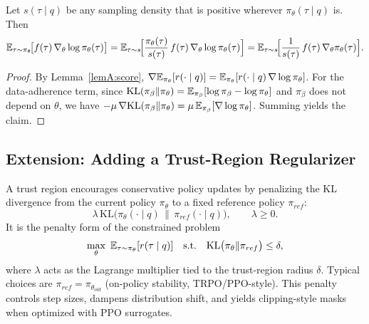 \begin{lemmaA}
\label{lemA:measure}
Let $s(\tau\mid q)$ be any sampling density that is positive wherever $\pi_\theta(\tau\mid q)$ is. Then
\[
\mathbb{E}_{\tau\sim \pi_\theta}\!\big[f(\tau)\,\nabla_\theta \log \pi_\theta(\tau)\big]
=
\mathbb{E}_{\tau\sim s}\!\Big[\frac{\pi_\theta(\tau)}{s(\tau)}\,f(\tau)\,\nabla_\theta \log \pi_\theta(\tau)\Big]
=
\mathbb{E}_{\tau\sim s}\!\Big[\frac{1}{s(\tau)}\,f(\tau)\,\nabla_\theta \pi_\theta(\tau)\Big].
\]
\end{lemmaA}

\begin{proof}
By Lemma~\ref{lemA:score},
$\nabla \mathbb{E}_{\pi_\theta}[r(\cdot\mid q)]=\mathbb{E}_{\pi_\theta}[r(\cdot\mid q)\,\nabla \log \pi_\theta]$.
For the data-adherence term, since
$\mathrm{KL}(\pi_\beta\|\pi_\theta)=\mathbb{E}_{\pi_\beta}[\log \pi_\beta-\log \pi_\theta]$ and $\pi_\beta$ does not depend on $\theta$,
we have $-\mu\,\nabla \mathrm{KL}(\pi_\beta\|\pi_\theta)=\mu\,\mathbb{E}_{\pi_\beta}[\nabla \log \pi_\theta]$.
Summing yields the claim.
\end{proof}

\subsection{Extension: Adding a Trust-Region Regularizer}
\label{app:lambda-extension}
A trust region encourages conservative policy updates by penalizing the KL divergence from the current policy $\pi_\theta$ to a fixed reference policy $\pi_{ref}$:
\[
\lambda\,\mathrm{KL}\big(\pi_\theta(\cdot\mid q)\,\|\,\pi_{ref}(\cdot\mid q)\big),\qquad \lambda\ge 0.
\]
It is the penalty form of the constrained problem
\[
\max_\theta\ \mathbb{E}_{\tau\sim \pi_\theta}[r(\tau\mid q)]
\quad \text{s.t.}\quad \mathrm{KL}\big(\pi_\theta\|\pi_{ref}\big)\le \delta,
\]
where $\lambda$ acts as the Lagrange multiplier tied to the trust-region radius $\delta$.
Typical choices are $\pi_{ref}=\pi_{\theta_{old}}$ (on-policy stability, TRPO/PPO-style). This penalty controls step sizes, dampens distribution shift, and yields clipping-style masks when optimized with PPO surrogates.

